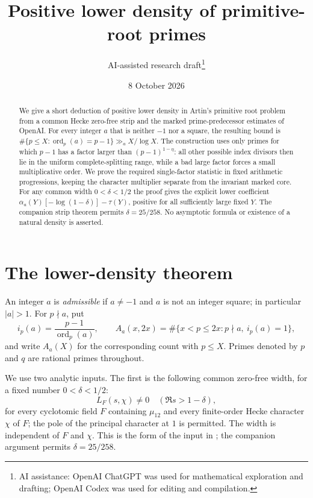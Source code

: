 \documentclass[11pt]{article}
\title{Positive lower density of primitive-root primes}
\author{AI-assisted research draft\thanks{AI assistance: OpenAI ChatGPT was used for mathematical exploration and drafting; OpenAI Codex was used for editing and compilation.}}
\date{8 October 2026}
\theoremstyle{remark}
\newcommand{\ord}{\operatorname{ord}}
\newcommand{\1}{\mathbf 1}
\begin{document}
\maketitle

\begin{abstract}
We give a short deduction of positive lower density in Artin's
primitive root problem from a common Hecke zero-free strip and the
marked prime-predecessor estimates of OpenAI.  For every integer
$a$ that is neither $-1$ nor a square, the resulting bound is
$\#\{p\le X:\ord_p(a)=p-1\}\gg_a X/\log X$.
The construction uses only primes for which $p-1$ has a factor
larger than $(p-1)^{1-\eta}$: all other possible index divisors then
lie in the uniform complete-splitting range, while a bad large
factor forces a small multiplicative order.  We prove the required
single-factor statistic in fixed arithmetic progressions, keeping
the character multiplier separate from the invariant marked core.
For any common width $0<\delta<1/2$ the proof gives the explicit
lower coefficient $\alpha_a(Y)[-\log(1-\delta)]-\tau(Y)$, positive
for all sufficiently large fixed $Y$.  The companion strip theorem
permits $\delta=25/258$.  No asymptotic formula or existence of a
natural density is asserted.
\end{abstract}

\section{The lower-density theorem}

An integer $a$ is \emph{admissible} if $a\ne-1$ and $a$ is not an
integer square; in particular $|a|>1$.  For $p\nmid a$, put
\[
 i_p(a)=\frac{p-1}{\ord_p(a)},\qquad
 A_a(x,2x)=\#\{x<p\le2x:p\nmid a,\ i_p(a)=1\},
\]
and write $A_a(X)$ for the corresponding count with $p\le X$.
Primes denoted by $p$ and $q$ are rational primes throughout.

We use two analytic inputs.  The first is the following common
zero-free width, for a fixed number $0<\delta<1/2$:
\begin{equation}\tag{$H_\delta$}\label{eq:H}
 L_F(s,\chi)\ne0\quad(\Re s>1-\delta),
\end{equation}
for every cyclotomic field $F$ containing $\mu_{12}$ and every
finite-order Hecke character $\chi$ of $F$; the pole of the
principal character at $1$ is permitted.  The width is independent
of $F$ and $\chi$.  This is the form of the input in
\cite[Theorem~1.2]{OAI}; the companion argument \cite{Strip}
permits $\delta=25/258$.
\end{document}
